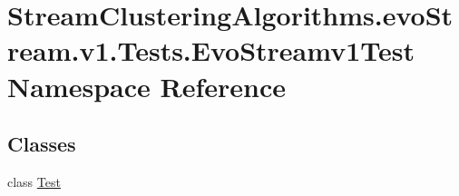 \hypertarget{namespaceStreamClusteringAlgorithms_1_1evoStream_1_1v1_1_1Tests_1_1EvoStreamv1Test}{}\section{Stream\+Clustering\+Algorithms.\+evo\+Stream.\+v1.\+Tests.\+Evo\+Streamv1\+Test Namespace Reference}
\label{namespaceStreamClusteringAlgorithms_1_1evoStream_1_1v1_1_1Tests_1_1EvoStreamv1Test}
\subsection*{Classes}
\begin{DoxyCompactItemize}
\item 
class \hyperlink{classStreamClusteringAlgorithms_1_1evoStream_1_1v1_1_1Tests_1_1EvoStreamv1Test_1_1Test}{Test}
\end{DoxyCompactItemize}
